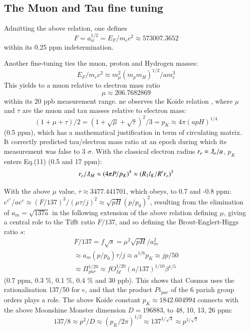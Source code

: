 \documentclass[twoside,draft]{article}
\begin{document}
\begin{sloppypar}
{\subsection {The Muon and Tau fine tuning}

Admitting the above relation, one defines 
\begin{equation} 
F = a_{w}^{1/2} = E_{F} /m_{e} c^{2} \approx 573007.3652
\end{equation}
within its 0.25 ppm indetermination. 

Another fine-tuning ties the muon, proton and Hydrogen masses: 
\begin{equation}
E_{F}/m_{e} c^{2} \approx
m_{\mu}^{2}(m_{p} m_{H})^{1/2}/am_{e}^{3}
\end{equation} 
This yields to a muon relative to electron mass ratio 
\begin{equation}
\mu \approx 206.7682869
\end{equation} within its 20 ppb measurement range.
ne observes the Koide relation \cite{Atiyah1}, where $\mu$ and $\tau$ are the muon and tau masses relative to electron mass:
\begin{equation}
(1 + \mu + \tau)/2 = (1 + \sqrt\mu + \sqrt\tau)^2/3 = p_K \approx 4\pi (apH)^{1/4}
\end{equation}
(0.5 ppm), which has a mathematical justification in term of circulating matrix. It correctly predicted tau/electron
mass ratio at an epoch during which its measurement was false to 3 $\sigma$. With the classical electron radius $r_e = \lambdabar_e/a$, $p_K$ enters Eq.(11) (0.5 and 17 ppm):
\begin{equation}
r_{e}/\lambdabar_M \approx(4\pi P/p_K)^4 \approx (R_1l_K/R^{\prime}r_e)^3 
\end{equation}

With the above $\mu$ value, $\tau \approx 3477.441701$, which obeys, to 0.7 and -0.8 ppm: $e^{e^e}/a e^e \approx (F/137)^{3}/ (\mu\tau/j)^2 \approx  \sqrt{pH} (p/p_0)^2$, resulting from the elimination of $a_m = \sqrt{137a}$ in the following extension of the above relation defining $\mu$, giving a central role to the Tifft ratio $F/137$, and so defining the Brout-Englert-Higgs ratio $s$:
$$
\begin{array}{ll}
%
\displaystyle
F/137 = f \sqrt{s} = \mu^2 \sqrt{pH}/a_m^2 \\ \approx a_m (p/p_0) \tau /j \approx a^{1/6}p_K \approx jp/50 \\
\approx \Pi_{par}^{1/20}
\approx f O_M^{1/20}(a/137)^{1/10}\beta^{1/5} 
\end{array}
$$
(0.7 ppm, 0.3 \%, 0.1 \%, 0.4  \% and 30 ppb). This shows that Cosmos uses the rationalisation 137/50 for $e$, and that the product $Pi_{par}$ of the 6 pariah group orders plays a role. The above Koide constant $p_K \approx 1842.604994$ connects with the above Moonshine Monster dimension \cite{Conway} $D = 196883$, to 48, 10, 13, 26 ppm:
$$137/8 \approx p^2/D  \approx (p_K/2\pi)^{1/2} \approx 137^{1/\sqrt3} \approx p^{1/\sqrt7}$$

}
\end{sloppypar}
\end{document}
